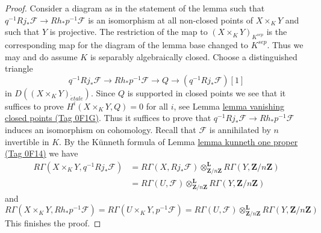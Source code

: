 \documentclass{amsart}
\theoremstyle{plain}
\theoremstyle{definition}
\theoremstyle{remark}
\numberwithin{equation}{subsection}
\def\etale{{\acute{e}tale}}
\begin{document}
\begin{proof}
\medskip\noindent
Consider a diagram as in the statement of the lemma
such that $q^{-1}Rj_*\mathcal{F} \to Rh_*p^{-1}\mathcal{F}$
is an isomorphism at all non-closed points of $X \times_K Y$
and such that $Y$ is projective.
The restriction of the map to $(X \times_K Y)_{K^{sep}}$
is the corresponding map for the diagram of the lemma
base changed to $K^{sep}$. Thus we may and do assume $K$
is separably algebraically closed. Choose a distinguished triangle
$$
q^{-1}Rj_*\mathcal{F} \to Rh_*p^{-1}\mathcal{F} \to Q \to
(q^{-1}Rj_*\mathcal{F})[1]
$$
in $D((X \times_K Y)_\etale)$. Since $Q$ is supported in
closed points we see that it suffices to prove
$H^i(X \times_K Y, Q) = 0$ for all $i$, see
Lemma \href{https://stacks.math.columbia.edu/tag/0F1G}{lemma vanishing closed points (Tag 0F1G)}.
Thus it suffices to prove that
$q^{-1}Rj_*\mathcal{F} \to Rh_*p^{-1}\mathcal{F}$
induces an isomorphism on cohomology. Recall that $\mathcal{F}$
is annihilated by $n$ invertible in $K$.
By the K\"unneth formula of Lemma \href{https://stacks.math.columbia.edu/tag/0F14}{lemma kunneth one proper (Tag 0F14)}
we have
\begin{align*}
R\Gamma(X \times_K Y, q^{-1}Rj_*\mathcal{F})
&=
R\Gamma(X, Rj_*\mathcal{F})
\otimes_{\mathbf{Z}/n\mathbf{Z}}^\mathbf{L}
R\Gamma(Y, \mathbf{Z}/n\mathbf{Z}) \\
& =
R\Gamma(U, \mathcal{F})
\otimes_{\mathbf{Z}/n\mathbf{Z}}^\mathbf{L}
R\Gamma(Y, \mathbf{Z}/n\mathbf{Z})
\end{align*}
and
$$
R\Gamma(X \times_K Y, Rh_*p^{-1}\mathcal{F}) =
R\Gamma(U \times_K Y, p^{-1}\mathcal{F}) =
R\Gamma(U, \mathcal{F})
\otimes_{\mathbf{Z}/n\mathbf{Z}}^\mathbf{L}
R\Gamma(Y, \mathbf{Z}/n\mathbf{Z})
$$
This finishes the proof.
\end{proof}
\end{document}
